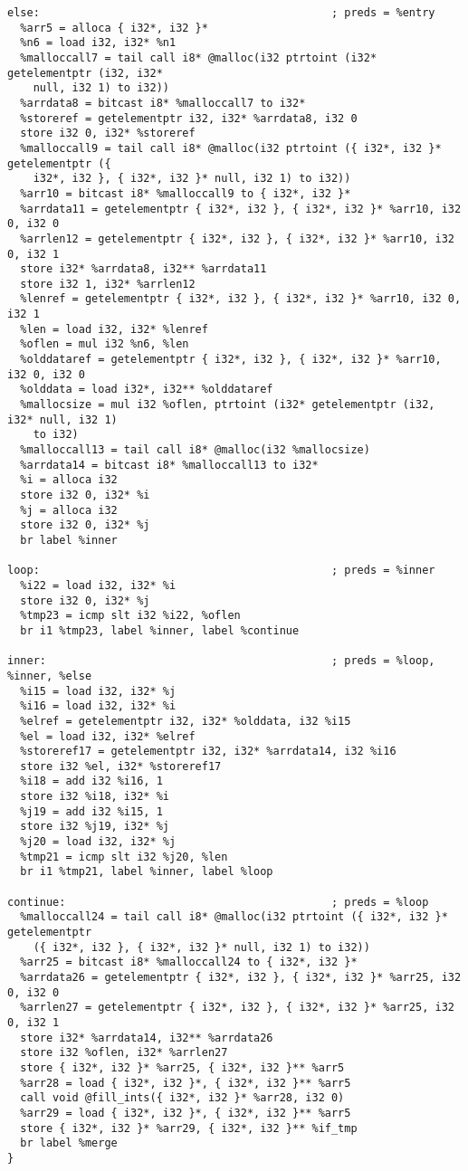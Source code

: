 \documentclass[main.tex]{subfiles}
\begin{document}
{\begin{lstlisting}
else:                                             ; preds = %entry
  %arr5 = alloca { i32*, i32 }*
  %n6 = load i32, i32* %n1
  %malloccall7 = tail call i8* @malloc(i32 ptrtoint (i32* getelementptr (i32, i32* 
    null, i32 1) to i32))
  %arrdata8 = bitcast i8* %malloccall7 to i32*
  %storeref = getelementptr i32, i32* %arrdata8, i32 0
  store i32 0, i32* %storeref
  %malloccall9 = tail call i8* @malloc(i32 ptrtoint ({ i32*, i32 }* getelementptr ({ 
    i32*, i32 }, { i32*, i32 }* null, i32 1) to i32))
  %arr10 = bitcast i8* %malloccall9 to { i32*, i32 }*
  %arrdata11 = getelementptr { i32*, i32 }, { i32*, i32 }* %arr10, i32 0, i32 0
  %arrlen12 = getelementptr { i32*, i32 }, { i32*, i32 }* %arr10, i32 0, i32 1
  store i32* %arrdata8, i32** %arrdata11
  store i32 1, i32* %arrlen12
  %lenref = getelementptr { i32*, i32 }, { i32*, i32 }* %arr10, i32 0, i32 1
  %len = load i32, i32* %lenref
  %oflen = mul i32 %n6, %len
  %olddataref = getelementptr { i32*, i32 }, { i32*, i32 }* %arr10, i32 0, i32 0
  %olddata = load i32*, i32** %olddataref
  %mallocsize = mul i32 %oflen, ptrtoint (i32* getelementptr (i32, i32* null, i32 1) 
    to i32)
  %malloccall13 = tail call i8* @malloc(i32 %mallocsize)
  %arrdata14 = bitcast i8* %malloccall13 to i32*
  %i = alloca i32
  store i32 0, i32* %i
  %j = alloca i32
  store i32 0, i32* %j
  br label %inner

loop:                                             ; preds = %inner
  %i22 = load i32, i32* %i
  store i32 0, i32* %j
  %tmp23 = icmp slt i32 %i22, %oflen
  br i1 %tmp23, label %inner, label %continue

inner:                                            ; preds = %loop, %inner, %else
  %i15 = load i32, i32* %j
  %i16 = load i32, i32* %i
  %elref = getelementptr i32, i32* %olddata, i32 %i15
  %el = load i32, i32* %elref
  %storeref17 = getelementptr i32, i32* %arrdata14, i32 %i16
  store i32 %el, i32* %storeref17
  %i18 = add i32 %i16, 1
  store i32 %i18, i32* %i
  %j19 = add i32 %i15, 1
  store i32 %j19, i32* %j
  %j20 = load i32, i32* %j
  %tmp21 = icmp slt i32 %j20, %len
  br i1 %tmp21, label %inner, label %loop

continue:                                         ; preds = %loop
  %malloccall24 = tail call i8* @malloc(i32 ptrtoint ({ i32*, i32 }* getelementptr 
    ({ i32*, i32 }, { i32*, i32 }* null, i32 1) to i32))
  %arr25 = bitcast i8* %malloccall24 to { i32*, i32 }*
  %arrdata26 = getelementptr { i32*, i32 }, { i32*, i32 }* %arr25, i32 0, i32 0
  %arrlen27 = getelementptr { i32*, i32 }, { i32*, i32 }* %arr25, i32 0, i32 1
  store i32* %arrdata14, i32** %arrdata26
  store i32 %oflen, i32* %arrlen27
  store { i32*, i32 }* %arr25, { i32*, i32 }** %arr5
  %arr28 = load { i32*, i32 }*, { i32*, i32 }** %arr5
  call void @fill_ints({ i32*, i32 }* %arr28, i32 0)
  %arr29 = load { i32*, i32 }*, { i32*, i32 }** %arr5
  store { i32*, i32 }* %arr29, { i32*, i32 }** %if_tmp
  br label %merge
}


\end{lstlisting}}
\end{document}
